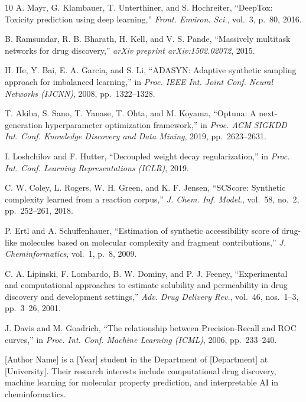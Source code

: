 \documentclass[lettersize,journal]{IEEEtran}
\begin{document}
\begin{thebibliography}{10}
  A. Mayr, G. Klambauer, T. Unterthiner, and S. Hochreiter, ``DeepTox:
  Toxicity prediction using deep learning,'' \textit{Front. Environ. Sci.},
  vol.~3, p.~80, 2016.

  B. Ramsundar, R. B. Bharath, H. Kell, and V. S. Pande, ``Massively multitask
  networks for drug discovery,'' \textit{arXiv preprint arXiv:1502.02072}, 2015.

  H. He, Y. Bai, E. A. Garcia, and S. Li, ``ADASYN: Adaptive synthetic
  sampling approach for imbalanced learning,'' in \textit{Proc. IEEE Int.
  Joint Conf. Neural Networks (IJCNN)}, 2008, pp.~1322--1328.

  T. Akiba, S. Sano, T. Yanase, T. Ohta, and M. Koyama, ``Optuna: A
  next-generation hyperparameter optimization framework,'' in \textit{Proc.
  ACM SIGKDD Int. Conf. Knowledge Discovery and Data Mining}, 2019,
  pp.~2623--2631.

  I. Loshchilov and F. Hutter, ``Decoupled weight decay regularization,''
  in \textit{Proc. Int. Conf. Learning Representations (ICLR)}, 2019.

  C. W. Coley, L. Rogers, W. H. Green, and K. F. Jensen, ``SCScore: Synthetic
  complexity learned from a reaction corpus,'' \textit{J. Chem. Inf. Model.},
  vol.~58, no.~2, pp.~252--261, 2018.

  P. Ertl and A. Schuffenhauer, ``Estimation of synthetic accessibility score
  of drug-like molecules based on molecular complexity and fragment
  contributions,'' \textit{J. Cheminformatics}, vol.~1, p.~8, 2009.

  C. A. Lipinski, F. Lombardo, B. W. Dominy, and P. J. Feeney,
  ``Experimental and computational approaches to estimate solubility and
  permeability in drug discovery and development settings,''
  \textit{Adv. Drug Delivery Rev.}, vol.~46, nos.~1--3, pp.~3--26, 2001.

  J. Davis and M. Goadrich, ``The relationship between Precision-Recall and
  ROC curves,'' in \textit{Proc. Int. Conf. Machine Learning (ICML)}, 2006,
  pp.~233--240.

  \end{thebibliography}

  \newpage
  \begin{IEEEbiographynophoto}{[Author Name]}
  is a [Year] student in the Department of [Department] at [University].
  Their research interests include computational drug discovery, machine
  learning for molecular property prediction, and interpretable AI in
  cheminformatics.
  \end{IEEEbiographynophoto}

  \vfill

  
\end{document}
